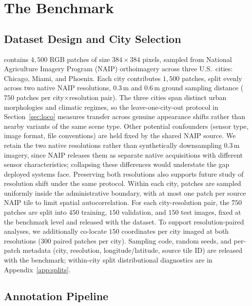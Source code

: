 \section{The \shadow Benchmark}
\label{sec:benchmark}

\subsection{Dataset Design and City Selection}
\label{sec:design}

\shadow contains $4{,}500$ RGB patches of size $384{\times}384$ pixels, sampled from National Agriculture Imagery Program (NAIP) orthoimagery across three U.S.\ cities: Chicago, Miami, and Phoenix. Each city contributes $1{,}500$ patches, split evenly across two native NAIP resolutions, $0.3$\,m and $0.6$\,m ground sampling distance ($750$ patches per city$\times$resolution pair). The three cities span distinct urban morphologies and climatic regimes, so the leave-one-city-out protocol in Section~\ref{sec:loco} measures transfer across genuine appearance shifts rather than nearby variants of the same scene type. Other potential confounders (sensor type, image format, file conventions) are held fixed by the shared NAIP source. We retain the two native resolutions rather than synthetically downsampling $0.3$\,m imagery, since NAIP releases them as separate native acquisitions with different sensor characteristics; collapsing these differences would understate the gap deployed systems face. Preserving both resolutions also supports future study of resolution shift under the same protocol. Within each city, patches are sampled uniformly inside the administrative boundary, with at most one patch per source NAIP tile to limit spatial autocorrelation. For each city-resolution pair, the $750$ patches are split into $450$ training, $150$ validation, and $150$ test images, fixed at the benchmark level and released with the dataset. To support resolution-paired analyses, we additionally co-locate $150$ coordinates per city imaged at both resolutions ($300$ paired patches per city). Sampling code, random seeds, and per-patch metadata (city, resolution, longitude/latitude, source tile ID) are released with the benchmark; within-city split distributional diagnostics are in Appendix~\ref{app:splits}.

\subsection{Annotation Pipeline}
\label{sec:annotation}


